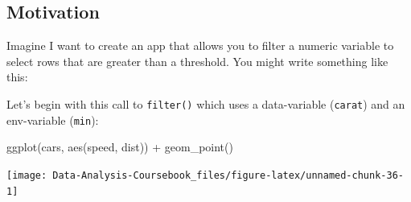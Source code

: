 \documentclass[
]{article}
\newenvironment{Shaded}{\begin{snugshade}}{\end{snugshade}}
\newcommand{\FunctionTok}[1]{\textcolor[rgb]{0.00,0.00,0.00}{#1}}
\newcommand{\NormalTok}[1]{#1}
\newcommand{\SpecialCharTok}[1]{\textcolor[rgb]{0.00,0.00,0.00}{#1}}
\begin{document}
\hypertarget{tidy-motivation}{%
\subsection{Motivation}\label{tidy-motivation}}

Imagine I want to create an app that allows you to filter a numeric variable to select rows that are greater than a threshold.
You might write something like this:

Let's begin with this call to \texttt{filter()} which uses a data-variable (\texttt{carat}) and an env-variable (\texttt{min}):

\begin{Shaded}
\begin{Highlighting}[]
\FunctionTok{ggplot}\NormalTok{(cars, }\FunctionTok{aes}\NormalTok{(speed, dist)) }\SpecialCharTok{+} 
  \FunctionTok{geom\_point}\NormalTok{()}
\end{Highlighting}
\end{Shaded}

\begin{center}\texttt{[image: Data-Analysis-Coursebook\_files/figure-latex/unnamed-chunk-36-1]} \end{center}

  
\end{document}
